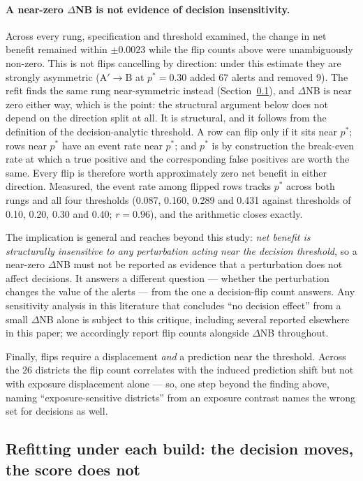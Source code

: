 \paragraph{A near-zero $\Delta$NB is not evidence of decision insensitivity.} Across every rung, specification and threshold examined, the change in net benefit remained within $\pm0.0023$ while the flip counts above were unambiguously non-zero. This is not flips cancelling by direction: under this estimate they are strongly asymmetric (A$'\to$B at $p^*=0.30$ added 67 alerts and removed 9). The refit finds the same rung near-symmetric instead (Section~\ref{sec:results-wp5-refit}), and $\Delta$NB is near zero either way, which is the point: the structural argument below does not depend on the direction split at all. It is structural, and it follows from the definition of the decision-analytic threshold. A row can flip only if it sits near $p^*$; rows near $p^*$ have an event rate near $p^*$; and $p^*$ is by construction the break-even rate at which a true positive and the corresponding false positives are worth the same. Every flip is therefore worth approximately zero net benefit in either direction. Measured, the event rate among flipped rows tracks $p^*$ across both rungs and all four thresholds (0.087, 0.160, 0.289 and 0.431 against thresholds of 0.10, 0.20, 0.30 and 0.40; $r=0.96$), and the arithmetic closes exactly.

The implication is general and reaches beyond this study: \emph{net benefit is structurally insensitive to any perturbation acting near the decision threshold}, so a near-zero $\Delta$NB must not be reported as evidence that a perturbation does not affect decisions. It answers a different question --- whether the perturbation changes the value of the alerts --- from the one a decision-flip count answers. Any sensitivity analysis in this literature that concludes ``no decision effect'' from a small $\Delta$NB alone is subject to this critique, including several reported elsewhere in this paper; we accordingly report flip counts alongside $\Delta$NB throughout.

Finally, flips require a displacement \emph{and} a prediction near the threshold. Across the 26 districts the flip count correlates with the induced prediction shift but not with exposure displacement alone --- so, one step beyond the finding above, naming ``exposure-sensitive districts'' from an exposure contrast names the wrong set for decisions as well.

\subsection{Refitting under each build: the decision moves, the score does not}
\label{sec:results-wp5-refit}


